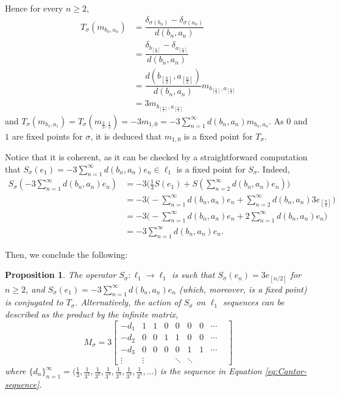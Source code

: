\documentclass[11pt,reqno]{article}
\newtheorem{proposition}[statement]{Proposition}
\def\dd{\delta}
\begin{document}
Hence for every $n\geq 2$, 
\begin{align*}
    T_\sigma (m_{b_n,a_n}) &=%
    \dfrac{\dd_{\sigma(b_n)}-\dd_{\sigma(a_n)}}{d(b_n,a_n)} \\
    &=\dfrac{\dd_{b_{[\frac{n}{2}]}}-\dd_{a_{[\frac{n}{2}]}}}{d(b_n,a_n)} \\
    &= \dfrac{d(b_{[\frac{n}{2}]},a_{[\frac{n}{2}]}) }{d(b_n,a_n)} m_{b_{[\frac{n}{2}]},a_{[\frac{n}{2}]}} \\
    &= 3 m_{b_{[\frac{n}{2}]},a_{[\frac{n}{2}]}}
\end{align*}
  and $T_\sigma (m_{b_1,a_1})=T_\sigma (m_{\frac{2}{3},\frac{1}{3}})= - 3 m_{1,0} = - 3 \sum_{n=1}^\infty d(b_n,a_n) m_{b_n,a_n} $. As $0$ and $1$ are fixed points for $\sigma$, it is deduced that $m_{1,0}$ is a fixed point for $T_\sigma$. 

Notice that it is coherent, as it can be checked by a straightforward computation that $S_\sigma (e_1)= -3 \sum_{n=1}^\infty d(b_n,a_n) e_n \in \ell_1$ is a fixed point for $S_\sigma$. Indeed, 
\begin{align*}
    S_\sigma( -3 \sum_{n=1}^\infty d(b_n,a_n) e_n) &= -3\Big( \frac{1}{3}S(e_1) + S( \sum_{n=2}^\infty d(b_n,a_n) e_n) \Big)\\
    &= -3\Big( - \sum_{n=1}^\infty d(b_n,a_n)e_n + \sum_{n=2}^\infty d(b_n,a_n) 3 e_{[\frac{n}{2}]}   \Big)\\
    &= -3\Big( - \sum_{n=1}^\infty d(b_n,a_n)e_n + 2\sum_{n=1}^\infty d(b_n,a_n)  e_n   \Big)\\
    &= -3 \sum_{n=1}^\infty d(b_n,a_n) e_n.
\end{align*}

Then, we conclude the following:

\begin{proposition}
    The operator $S_\sigma \colon \ell_1 \to \ell_1$ is %
    such that $S_\sigma (e_n)= 3 e_{[n/2]}$ for $n\geq 2$, and $S_\sigma (e_1)= -3 \sum_{n=1}^\infty d(b_n,a_n) e_n$ (which, moreover, is a fixed point) is conjugated to $T_\sigma$. Alternatively, the action of $S_\sigma$ on $\ell_1$ sequences can be described as the product by the infinite matrix, 
    \begin{equation*}
M_\sigma= 3
 \begin{bmatrix}
  - d_1 & 1 & 1& 0 & 0 & 0&0&\cdots & \\
   -d_2 & 0 & 0& 1 & 1 &0 &0&\cdots & \\
    -d_3 & 0 & 0& 0 & 0 &1 & 1&\cdots & \\
      \vdots &  \vdots & &  &  \ddots &\ddots & & &
 \end{bmatrix}
\end{equation*}
where $\{d_n\}_{n=1}^\infty =\Big(\frac{1}{3},\frac{1}{3^2},\frac{1}{3^2}, \frac{1}{3^3}, \frac{1}{3^3},\frac{1}{3^3},\frac{1}{3^3},... \Big)$ is the sequence in Equation \ref{eq:Cantor-sequence}.
\end{proposition}
\end{document}
